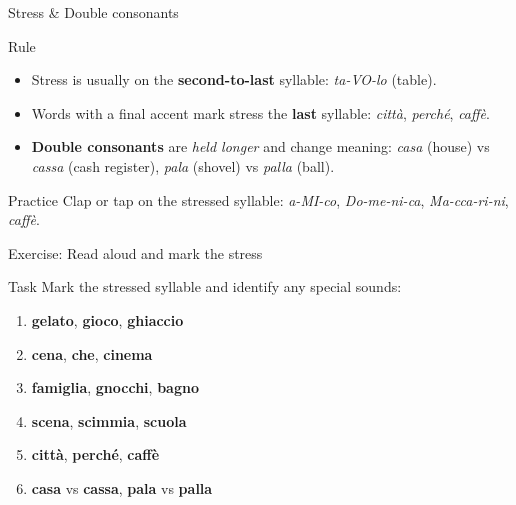 \blueheader
\begin{frame}{Stress \& Double consonants}
\begin{red*}{Rule}
\begin{itemize}
  \item Stress is usually on the \textbf{second-to-last} syllable: \textit{ta-VO-lo} (table).
  \item Words with a final accent mark stress the \textbf{last} syllable: \textit{citt\`a}, \textit{perch\'e}, \textit{caff\`e}.
  \item \textbf{Double consonants} are \emph{held longer} and change meaning: 
    \textit{casa} (house) vs \textit{cassa} (cash register), 
    \textit{pala} (shovel) vs \textit{palla} (ball).
\end{itemize}
\end{red*}

\begin{cyan*}{Practice}
Clap or tap on the stressed syllable: \textit{a-MI-co}, \textit{Do-me-ni-ca}, \textit{Ma-cca-ri-ni}, \textit{caff\`e}.
\end{cyan*}
\end{frame}

\cyanheader
\begin{frame}{Exercise: Read aloud and mark the stress}
\begin{cyan*}{Task}
Mark the stressed syllable and identify any special sounds:
\begin{enumerate}
  \item \textbf{gelato}, \textbf{gioco}, \textbf{ghiaccio}
  \item \textbf{cena}, \textbf{che}, \textbf{cinema}
  \item \textbf{famiglia}, \textbf{gnocchi}, \textbf{bagno}
  \item \textbf{scena}, \textbf{scimmia}, \textbf{scuola}
  \item \textbf{citt\`a}, \textbf{perch\'e}, \textbf{caff\`e}
  \item \textbf{casa} vs \textbf{cassa}, \textbf{pala} vs \textbf{palla}
\end{enumerate}
\end{cyan*}
\end{frame}
